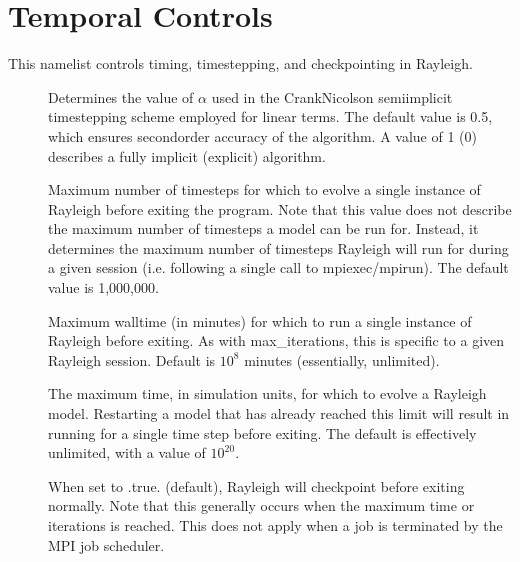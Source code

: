 \documentclass[letterpaper,11pt,english]{sphinxmanual}
\begin{document}
\section{Temporal Controls}
\label{\detokenize{doc/source/Namelist_Definitions/Namelist_Variables:temporal-controls}}
\sphinxAtStartPar
This namelist controls timing, time\sphinxhyphen{}stepping, and checkpointing in Rayleigh.
\begin{description}
\item[{}] \leavevmode
\sphinxAtStartPar
Determines the value of \(\alpha\) used in the Crank\sphinxhyphen{}Nicolson semi\sphinxhyphen{}implicit time\sphinxhyphen{}stepping scheme employed for linear terms.  The default value is 0.5, which ensures second\sphinxhyphen{}order accuracy of the algorithm.  A value of 1 (0) describes a fully implicit (explicit) algorithm.

\item[{}] \leavevmode
\sphinxAtStartPar
Maximum number of timesteps for which to evolve a single instance of Rayleigh before exiting the program.  Note that this value does not describe the maximum number of timesteps a model can be run for.  Instead, it determines the maximum number of timesteps Rayleigh will run for during a given session (i.e. following a single call to mpiexec/mpirun).  The default value is 1,000,000.

\item[{}] \leavevmode
\sphinxAtStartPar
Maximum walltime (in minutes) for which to run a single instance of Rayleigh before exiting.  As with max\_iterations, this is specific to a given Rayleigh session.  Default is \(10^8\) minutes (essentially, unlimited).

\item[{}] \leavevmode
\sphinxAtStartPar
The maximum time, in simulation units, for which to evolve a Rayleigh model.  Restarting a model that has already reached this limit will result in running for a single time step before exiting.  The default is effectively unlimited, with a value of \(10^{20}\).

\item[{}] \leavevmode
\sphinxAtStartPar
When set to .true. (default), Rayleigh will checkpoint before exiting normally. Note that this generally occurs when the maximum time or iterations is reached.  This does not apply when a job is terminated by the MPI job scheduler.


\end{description}
\end{document}
